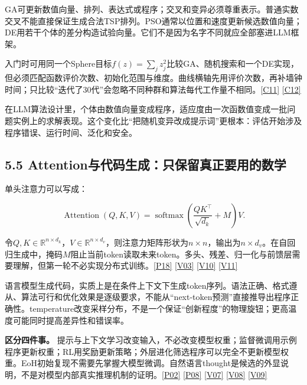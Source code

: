 GA可更新数值向量、排列、表达式或程序；交叉和变异必须尊重表示。普通实数交叉不能直接保证生成合法TSP排列。PSO通常以位置和速度更新候选数值向量；DE用若干个体的差分构造试验向量。它们不是因为名字不同就应全部塞进LLM框架。

入门时可用同一个Sphere目标\(f(z)=\sum_j z_j^2\)比较GA、随机搜索和一个DE实现，但必须匹配函数评价次数、初始化范围与维度。曲线横轴先用评价次数，再补墙钟时间；只比较``迭代了30代''会忽略不同种群和算法每代工作量不相同。\href{https://github.com/DEAP/deap}{{[}C11{]}}
\href{https://deap.readthedocs.io/en/master/tutorials/basic/part2.html}{{[}C12{]}}

在LLM算法设计里，个体由数值向量变成程序，适应度由一次函数值变成一批问题实例上的求解表现。这个变化比``把随机变异改成提示词''更根本：评估开始涉及程序错误、运行时间、泛化和安全。

\subsection{5.5
Attention与代码生成：只保留真正要用的数学}\label{attentionux4e0eux4ee3ux7801ux751fux6210ux53eaux4fddux7559ux771fux6b63ux8981ux7528ux7684ux6570ux5b66}

单头注意力可以写成：

\[
\operatorname{Attention}(Q,K,V)=
\operatorname{softmax}\!\left(\frac{QK^\top}{\sqrt{d_k}}+M\right)V.
\]

令\(Q,K\in\mathbb R^{n\times d_k}\)，\(V\in\mathbb R^{n\times d_v}\)，则注意力矩阵形状为\(n\times n\)，输出为\(n\times d_v\)。在自回归生成中，掩码\(M\)阻止当前token读取未来token。多头、残差、归一化与前馈层需要理解，但第一轮不必实现分布式训练。\href{https://arxiv.org/abs/1706.03762}{{[}P18{]}}
\href{https://courses.d2l.ai/zh-v2/}{{[}V03{]}}
\href{https://karpathy.ai/zero-to-hero.html}{{[}V10{]}}
\href{https://cs336.stanford.edu/spring2025/}{{[}V11{]}}

语言模型生成代码，实质上是在条件上下文下生成token序列。语法正确、格式遵从、算法可行和优化效果是逐级要求，不能从``next-token预测''直接推导出程序正确性。temperature改变采样分布，不是一个保证``创新程度''的物理旋钮；更高温度可能同时提高差异性和错误率。

\textbf{区分四件事。}
提示与上下文学习改变输入，不必改变模型权重；监督微调用示例程序更新权重；RL用奖励更新策略；外层进化筛选程序可以完全不更新模型权重。EoH初始复现不需要先掌握大模型微调。自然语言thought是候选的外显说明，不是对模型内部真实推理机制的证明。\href{https://arxiv.org/abs/2401.02051}{{[}P02{]}}
\href{https://arxiv.org/abs/2504.05108}{{[}P08{]}}
\href{https://www.youtube.com/watch?v=Ozos6M1JtIE}{{[}V07{]}}
\href{https://www.youtube.com/watch?v=Z6b5-77EfGk}{{[}V08{]}}
\href{https://www.youtube.com/watch?v=bJFtcwLSNxI}{{[}V09{]}}

